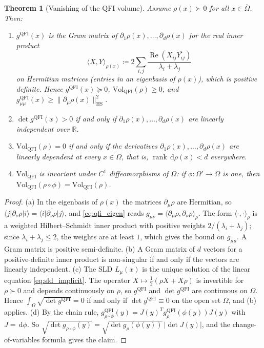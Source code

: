 \documentclass[11pt,a4paper,reqno]{amsart}
\newtheorem{theorem}{Theorem}[section]
\theoremstyle{definition}
\numberwithin{equation}{section}
\newcommand{\R}{\mathbb{R}}
\newcommand{\rank}{\operatorname{rank}}
\newcommand{\dif}{\,\mathrm{d}}
\begin{document}
\begin{theorem}[Vanishing of the QFI volume]
\label{thm:qfi_volume}
Assume $\rho(x) \succ 0$ for all $x \in \overline{\Omega}$. Then:
\begin{enumerate}[label=(\alph*)]
    \item $g^{\mathrm{QFI}}(x)$ is the Gram matrix of $\partial_1\rho(x), \dots, \partial_d\rho(x)$ for the real inner product
    \begin{equation}
        \langle X, Y\rangle_{\rho(x)} \coloneqq 2\sum_{i,j}\frac{\operatorname{Re}(X_{ij}\overline{Y_{ij}})}{\lambda_i + \lambda_j}
    \end{equation}
    on Hermitian matrices (entries in an eigenbasis of $\rho(x)$), which is positive definite. Hence $g^{\mathrm{QFI}}(x) \succeq 0$, $\mathrm{Vol}_{\mathrm{QFI}}(\rho) \ge 0$, and $g^{\mathrm{QFI}}_{\mu\mu}(x) \ge \|\partial_\mu\rho(x)\|_{\mathrm{HS}}^2$.
    \item $\det g^{\mathrm{QFI}}(x) > 0$ if and only if $\partial_1\rho(x), \dots, \partial_d\rho(x)$ are linearly independent over $\R$.
    \item $\mathrm{Vol}_{\mathrm{QFI}}(\rho) = 0$ if and only if the derivatives $\partial_1\rho(x), \dots, \partial_d\rho(x)$ are linearly dependent at every $x \in \Omega$, that is, $\rank \dif\rho(x) < d$ everywhere.
    \item $\mathrm{Vol}_{\mathrm{QFI}}$ is invariant under $C^1$ diffeomorphisms of $\Omega$: if $\phi \colon \Omega' \to \Omega$ is one, then $\mathrm{Vol}_{\mathrm{QFI}}(\rho \circ \phi) = \mathrm{Vol}_{\mathrm{QFI}}(\rho)$.
\end{enumerate}
\end{theorem}

\begin{proof}
(a) In the eigenbasis of $\rho(x)$ the matrices $\partial_\mu\rho$ are Hermitian, so $\langle j|\partial_\nu\rho|i\rangle = \overline{\langle i|\partial_\nu\rho|j\rangle}$, and \eqref{eq:qfi_eigen} reads $g_{\mu\nu} = \langle\partial_\mu\rho, \partial_\nu\rho\rangle_{\rho}$. The form $\langle\cdot,\cdot\rangle_\rho$ is a weighted Hilbert--Schmidt inner product with positive weights $2/(\lambda_i + \lambda_j)$; since $\lambda_i + \lambda_j \le 2$, the weights are at least $1$, which gives the bound on $g_{\mu\mu}$. A Gram matrix is positive semi-definite.
(b) A Gram matrix of $d$ vectors for a positive-definite inner product is non-singular if and only if the vectors are linearly independent.
(c) The SLD $L_\mu(x)$ is the unique solution of the linear equation \eqref{eq:sld_implicit}. The operator $X \mapsto \frac12(\rho X + X\rho)$ is invertible for $\rho \succ 0$ and depends continuously on $\rho$, so $g^{\mathrm{QFI}}$ and $\det g^{\mathrm{QFI}}$ are continuous on $\Omega$. Hence $\int_\Omega \sqrt{\det g^{\mathrm{QFI}}} = 0$ if and only if $\det g^{\mathrm{QFI}} \equiv 0$ on the open set $\Omega$, and (b) applies.
(d) By the chain rule, $g^{\mathrm{QFI}}_{\rho\circ\phi}(y) = J(y)^T g^{\mathrm{QFI}}_\rho(\phi(y)) J(y)$ with $J = \dif\phi$. So $\sqrt{\det g_{\rho\circ\phi}(y)} = \sqrt{\det g_\rho(\phi(y))}\,|\det J(y)|$, and the change-of-variables formula gives the claim.
\end{proof}
\end{document}
